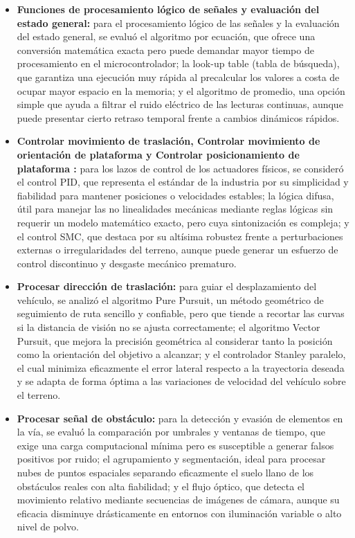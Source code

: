 \documentclass[../../General.tex]{subfiles}
\begin{document}
\begin{itemize}
	\item \textbf{Funciones de procesamiento lógico de señales y evaluación del estado general:} para el procesamiento lógico de las señales y la evaluación del estado general, se evaluó el algoritmo por ecuación, que ofrece una conversión matemática exacta pero puede demandar mayor tiempo de procesamiento en el microcontrolador; la look-up table (tabla de búsqueda), que garantiza una ejecución muy rápida al precalcular los valores a costa de ocupar mayor espacio en la memoria; y el algoritmo de promedio, una opción simple que ayuda a filtrar el ruido eléctrico de las lecturas continuas, aunque puede presentar cierto retraso temporal frente a cambios dinámicos rápidos.
	
	\item \textbf{Controlar movimiento de traslación, Controlar movimiento de orientación de plataforma y Controlar posicionamiento de plataforma :} para los lazos de control de los actuadores físicos, se consideró el control PID, que representa el estándar de la industria por su simplicidad y fiabilidad para mantener posiciones o velocidades estables; la lógica difusa, útil para manejar las no linealidades mecánicas mediante reglas lógicas sin requerir un modelo matemático exacto, pero cuya sintonización es compleja; y el control SMC, que destaca por su altísima robustez frente a perturbaciones externas o irregularidades del terreno, aunque puede generar un esfuerzo de control discontinuo y desgaste mecánico prematuro.
	
	\item \textbf{Procesar dirección de traslación:} para guiar el desplazamiento del vehículo, se analizó el algoritmo Pure Pursuit, un método geométrico de seguimiento de ruta sencillo y confiable, pero que tiende a recortar las curvas si la distancia de visión no se ajusta correctamente; el algoritmo Vector Pursuit, que mejora la precisión geométrica al considerar tanto la posición como la orientación del objetivo a alcanzar; y el controlador Stanley paralelo, el cual minimiza eficazmente el error lateral respecto a la trayectoria deseada y se adapta de forma óptima a las variaciones de velocidad del vehículo sobre el terreno.
	
	\item \textbf{Procesar señal de obstáculo:} para la detección y evasión de elementos en la vía, se evaluó la comparación por umbrales y ventanas de tiempo, que exige una carga computacional mínima pero es susceptible a generar falsos positivos por ruido; el agrupamiento y segmentación, ideal para procesar nubes de puntos espaciales separando eficazmente el suelo llano de los obstáculos reales con alta fiabilidad; y el flujo óptico, que detecta el movimiento relativo mediante secuencias de imágenes de cámara, aunque su eficacia disminuye drásticamente en entornos con iluminación variable o alto nivel de polvo.
	

\end{itemize}
\end{document}
